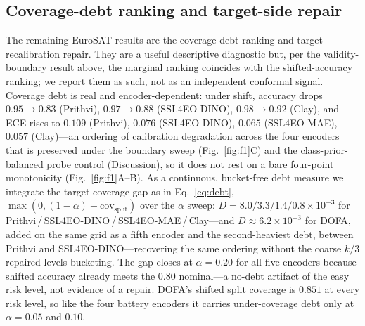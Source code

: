 \documentclass[preprint,11pt,authoryear]{elsarticle}
\begin{document}
\subsection*{Coverage-debt ranking and target-side repair}
The remaining EuroSAT results are the coverage-debt ranking and target-recalibration repair. They are a
useful descriptive diagnostic but, per the validity-boundary result above, the marginal ranking coincides
with the shifted-accuracy ranking; we report them as such, not as an independent conformal signal.
Coverage debt is real and encoder-dependent: under shift, accuracy drops $0.95\to0.83$ (Prithvi),
$0.97\to0.88$ (SSL4EO-DINO), $0.98\to0.92$ (Clay), and ECE rises to $0.109$ (Prithvi),
$0.076$ (SSL4EO-DINO), $0.065$ (SSL4EO-MAE), $0.057$ (Clay)---an ordering of calibration degradation across
the four encoders that is preserved under the boundary sweep (Fig.~\ref{fig:f1}C) and the
class-prior-balanced probe control (Discussion), so it does not rest on a bare four-point monotonicity
(Fig.~\ref{fig:f1}A--B). As a continuous, bucket-free debt measure we integrate the target coverage gap
as in Eq.~\eqref{eq:debt},
$\max(0,(1-\alpha)-\mathrm{cov}_{\mathrm{split}})$ over the $\alpha$ sweep:
$D = 8.0 / 3.3 / 1.4 / 0.8 \times 10^{-3}$ for Prithvi\,/\,SSL4EO-DINO\,/\,SSL4EO-MAE\,/\,Clay---and $D\approx6.2\times10^{-3}$ for DOFA, added on the same grid as a fifth encoder and the second-heaviest debt, between Prithvi and SSL4EO-DINO---recovering the
same ordering without the coarse $k/3$ repaired-levels bucketing. The gap closes at $\alpha=0.20$ for all
five encoders because shifted accuracy already meets the $0.80$ nominal---a no-debt artifact of the
easy risk level, not evidence of a repair. DOFA's shifted split coverage is $0.851$ at every risk level, so
like the four battery encoders it carries under-coverage debt only at $\alpha=0.05$ and $0.10$.

\end{document}
